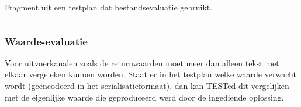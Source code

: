 \begin{listing}
    \caption{Fragment uit een testplan dat bestandsevaluatie gebruikt.}
    \label{lst:testplan-file}
    \inputminted[breaklines]{json}{code/testplan-file.json}
\end{listing}

\subsubsection{Waarde-evaluatie}

Voor uitvoerkanalen zoals de returnwaarden moet meer dan alleen tekst met elkaar vergeleken kunnen worden.
Staat er in het testplan welke waarde verwacht wordt (geëncodeerd in het serialisatieformaat), dan kan TESTed dit vergelijken met de eigenlijke waarde die geproduceerd werd door de ingediende oplossing.


